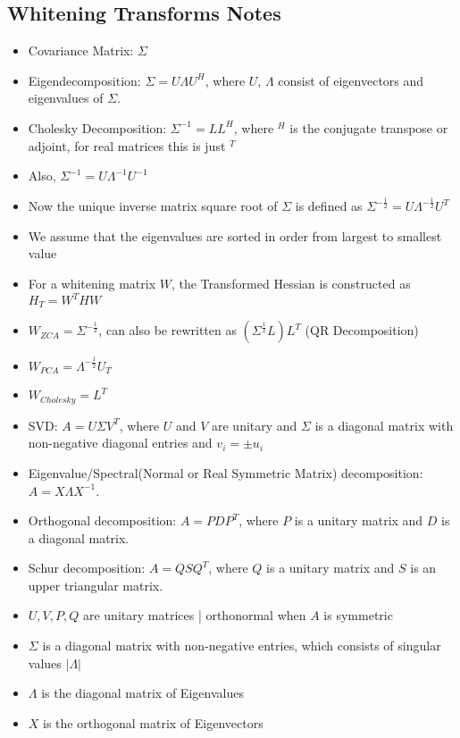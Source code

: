 \subsection{Whitening Transforms Notes}

\begin{itemize}

\item Covariance Matrix: $\Sigma$
\item Eigendecomposition: $\Sigma = U\Lambda U^{H}$, where $U$,  $\Lambda$ consist of eigenvectors and eigenvalues of $\Sigma$.
\item Cholesky Decomposition: $\Sigma^{-1} = LL^{H}$, where $^{H}$ is the conjugate transpose or adjoint, for real matrices this is just $^{T}$
\item Also, $\Sigma^{-1} = U \Lambda^{-1} U^{-1}$
\item Now the unique inverse matrix square root of $\Sigma$ is defined as  $\Sigma^{-\frac{1}{2}} = U\Lambda^{-\frac{1}{2}}U^{T}$
\item We assume that the eigenvalues are sorted in order from largest to smallest value
\item For a whitening matrix $W$, the Transformed Hessian is constructed as $H_{T} = W^{T}HW$
\item $W_{ZCA} = \Sigma^{-\frac{1}{2}}$, can also be rewritten as $(\Sigma^{\frac{1}{2}} L) L^{T}$ (QR Decomposition)
\item $W_{PCA} = \Lambda^{-\frac{1}{2}}U_{T}$
\item $W_{Cholesky} = L^{T}$
\item SVD: $A=U \Sigma V^T$, where $U$ and $V$ are unitary and $\Sigma$ is a diagonal matrix with non-negative diagonal entries and $v_i= \pm u_i$
\item Eigenvalue/Spectral(Normal or Real Symmetric Matrix) decomposition: $A=X \Lambda X^{-1}$.
\item Orthogonal decomposition: $A=P D P^T$, where $P$ is a unitary matrix and $D$ is a diagonal matrix.
\item Schur decomposition: $A=Q S Q^T$, where $Q$ is a unitary matrix and $S$ is an upper triangular matrix.
\item $U, V, P, Q$ are unitary matrices | orthonormal when $A$ is symmetric
\item $\Sigma$ is a diagonal matrix with non-negative entries, which consists of singular values $|\Lambda|$ 
\item $\Lambda$ is the diagonal matrix of Eigenvalues
\item $X$ is the orthogonal matrix of Eigenvectors

\end{itemize}
